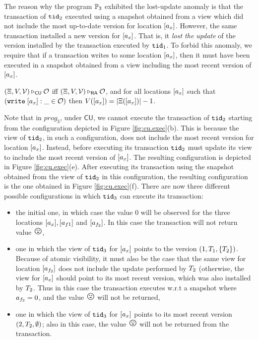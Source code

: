 The reason why the program $\mathbb{P}_3$ exhibited the lost-update anomaly is 
that the transaction of $\mathtt{tid}_2$ executed using a snapshot obtained from 
a view which did not include the most up-to-date version for location $[a_x]$. 
However, the same transaction installed a new version for $[a_x]$. That is, 
it \emph{lost the update} of the version installed by the transaction executed 
by $\mathtt{tid}_1$. To forbid this anomaly, we require that if a transaction 
writes to some location $[a_x]$, then it must have been executed 
in a snapshot obtained from a view including the most recent version of 
$[a_x]$.

\begin{definition}
$(\Xi, V, \mathcal{V}) \triangleright_{\mathsf{CU}} \mathcal{O}$ iff 
$(\Xi, V, \mathcal{V}) \triangleright_{\mathsf{RA}} \mathcal{O}$, and 
for all locations $[a_x]$ such that $({{\tt write}}\; [a_x] : \_ \in \mathcal{O})$ 
then $V([a_{x}]) = \lvert \Xi([a_x]) \rvert - 1$. 
\end{definition}

Note that in $prog_3$, under $\mathsf{CU}$, 
we cannot execute the transaction of $\mathtt{tid}_2$ starting from 
the configuration depicted in Figure \ref{fig:cu.exec}(b). This 
is because the view of $\mathtt{tid}_2$, in such a configuration, does 
not include the most recent version for location $[a_x]$. 
Instead, before executing its transaction $\mathtt{tid}_2$ must update 
its view to include the most recent version of $[a_x]$. The 
resulting configuration is depicted in Figure \ref{fig:cu.exec}(e). 
After executing its transaction using the snapshot obtained 
from the view of $\mathtt{tid}_2$ in this configuration, the resulting 
configuration is the one obtained in Figure \ref{fig:cu.exec}(f). 
There are now three different possible configurations in which 
$\mathtt{tid}_3$ can execute its transaction: 
\begin{itemize}
\item the initial one, in which case the value $0$ will be observed 
for the three locations $[a_x], [a_{f1}]$ and $[a_{f_2}]$. 
In this case the transaction will not return value ${\Large \frownie{}}$, 
\item one in which the view of $\mathtt{tid}_3$ for $[a_x]$ points to the 
version $(1, T_1, \{T_2\})$. Because of atomic visibility, 
it must also be the case that the same view for location $[a_{f_2}]$ 
does not include the update performed by $T_2$ (otherwise, 
the view for $[a_x]$ should point to its most recent version, which 
was also installed by $T_2$. Thus in this case the transaction executes 
w.r.t a snapshot where $a_{f_2} = 0$, and the value ${\Large \frownie{}}$ 
will not be returned, 
\item one in which the view of $\mathtt{tid}_3$ for $[a_x]$ points to 
its most recent version $(2, T_2, \emptyset)$; also in this case, 
the value ${\Large \frownie{}}$ will not be returned from the transaction.
\end{itemize}


